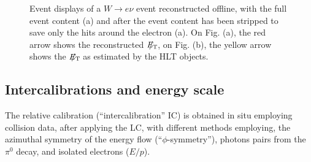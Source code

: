 \documentclass[journal]{IEEEtran}
\newcommand{\ETslash}{\ensuremath{E_{\mathrm{T}}\hspace{-1.1em}/\kern0.45em}}
\begin{document}
%
\begin{figure}[!t]
  \begin{center}
    \caption{Event displays of a $W\to e\nu$ event reconstructed offline, with the full event content (a) and after the event content has been stripped to save only the hits around the electron (a). On Fig. (a), the red arrow shows the reconstructed $\ETslash$, on Fig. (b), the yellow arrow shows the $\ETslash$ as estimated by the HLT objects. \label{fig:elestream}}
  \end{center}
\end{figure}
%


\subsection{Intercalibrations and energy scale}
\label{sec:intercalibrations}
The relative calibration (“intercalibration” IC) is obtained in situ employing collision data, after applying the LC, with different methods employing, the azimuthal symmetry of the energy flow (``$\phi$-symmetry''), photons pairs from the $\pi^0$ decay, and isolated electrons ($E/p$).
\end{document}
